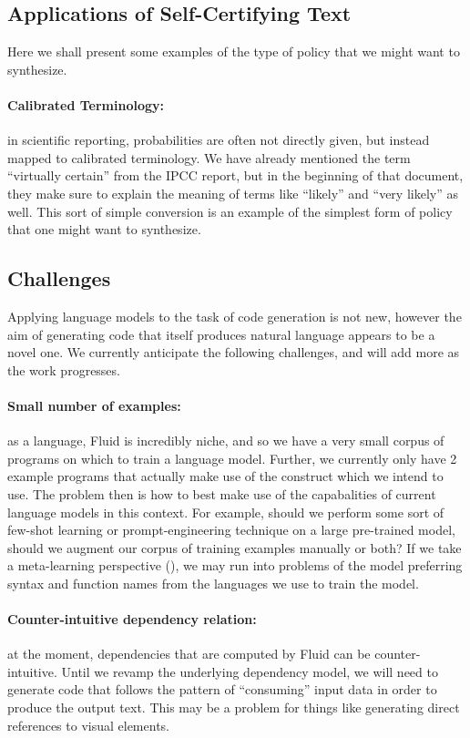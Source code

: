 \subsection{Applications of Self-Certifying Text}
Here we shall present some examples of the type of policy that we might want to synthesize.

\paragraph{Calibrated Terminology:} in scientific reporting, probabilities are often not directly given, but instead
mapped to calibrated terminology. We have already mentioned the term ``virtually certain'' from the IPCC report, but in the beginning
of that document, they make sure to explain the meaning of terms like ``likely'' and ``very likely'' as well. This
sort of simple conversion is an example of the simplest form of policy that one might want to synthesize.

\subsection{Challenges}
Applying language models to the task of code generation is not new, however the aim of generating code that
itself produces natural language appears to be a novel one. We currently anticipate the following challenges,
and will add more as the work progresses.

\paragraph{Small number of examples:} as a language, Fluid is incredibly niche, and so we have a very small corpus
of programs on which to train a language model. Further, we currently only have 2 example programs that actually make
use of the  construct which we intend to use. The problem then is how to best make use of the capabalities
of current language models in this context. For example, should we perform some sort of few-shot learning or prompt-engineering
technique on a large pre-trained model, should we augment our corpus of training examples manually or both? If we take a meta-learning
perspective (), we may run into problems of the model preferring syntax and function names from the languages we use to
train the model.

\paragraph{Counter-intuitive dependency relation:} at the moment, dependencies that are computed by Fluid can be counter-intuitive.
Until we revamp the underlying dependency model, we will need to generate code that follows the pattern of ``consuming'' input
data in order to produce the output text. This may be a problem for things like generating direct references to visual elements.

